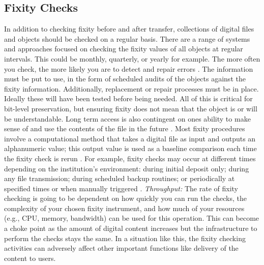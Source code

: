 \subsection{Fixity Checks}
In addition to checking fixity before and after transfer, collections of digital files and objects should be checked on a regular basis. There are a range of systems and approaches focused on checking the fixity values of all objects at regular intervals. This could be monthly, quarterly, or yearly for example. The more often you check, the more likely you are to detect and repair errors \cite[4]{ndsa2014fixity}.
The information must be put to use, in the form of scheduled audits of the objects against the fixity information. Additionally, replacement or repair processes must be in place. Ideally these will have been tested before being needed. All of this is critical for bit-level preservation, but ensuring fixity does not mean that the object is or will be understandable. Long term access is also contingent on ones ability to make sense of and use the contents of the file in the future \cite[2]{ndsa2014fixity}.
Most fixity procedures involve a computational method that takes a digital file as input and outputs an alphanumeric value; this output value is used as a baseline comparison each time the fixity check is rerun \cite[5]{ndsa2017fixity}. 
For example, fixity checks may occur at different times depending on the institution's environment: during initial deposit only; during any file transmission; during scheduled backup routines; or periodically at specified times or when manually triggered \cite[7]{ndsa2017fixity}.
\textit{Throughput:} The rate of fixity checking is going to be dependent on how quickly you can run the checks, the complexity of your chosen fixity instrument, and how much of your resources (e.g., CPU, memory, bandwidth) can be used for this operation. This can become a choke point as the amount of digital content increases but the infrastructure to perform the checks stays the same. In a situation like this, the fixity checking activities can adversely affect other important functions like delivery of the content to users.
